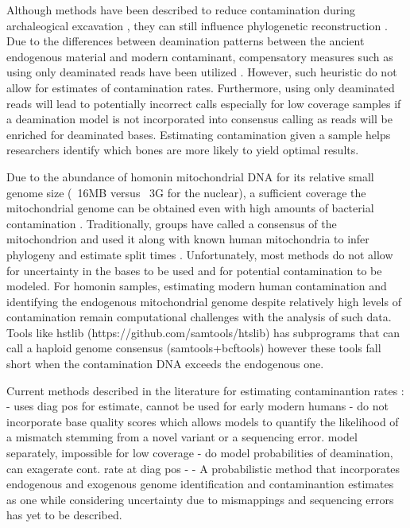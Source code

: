 \documentclass[a4paper,12pt]{article}
\begin{document}
Although methods have been described to reduce contamination during archaleogical excavation \cite{yang2005contamination}, they can still influence phylogenetic reconstruction \cite{wall2007inconsistencies}. Due to the differences between deamination patterns between the ancient endogenous material and modern contaminant, compensatory measures such as using only deaminated reads have been utilized \cite{skoglund2014separating}. However, such heuristic do not allow for estimates of contamination rates. Furthermore, using only deaminated reads will lead to potentially incorrect calls especially for low coverage samples if a deamination model is not incorporated into consensus calling as reads will be enriched for deaminated bases. Estimating contamination given a sample helps researchers identify which bones are more likely to yield optimal results. 

Due to the abundance of homonin mitochondrial DNA for its relative small genome size (~16MB versus ~3G for the nuclear), a sufficient coverage the mitochondrial genome can be obtained even with high amounts of bacterial contamination \cite{green2006analysis}. Traditionally, groups have called a consensus of the mitochondrion and used it along with known human mitochondria to infer phylogeny and estimate split times \cite{cann1987mitochondrial}. Unfortunately, most methods do not allow for uncertainty in the bases to be used and for potential contamination to be modeled. For homonin samples, estimating modern human contamination and identifying the endogenous mitochondrial genome despite relatively high levels of contamination remain computational challenges with the analysis of such data. Tools like hstlib (https://github.com/samtools/htslib) has subprograms that can call a haploid genome consensus (samtools+bcftools) however these tools fall short when the contamination DNA exceeds the endogenous one. 

Current methods \cite{philip} described in the literature for estimating contaminantion rates :
- uses diag pos for estimate, cannot be used for early modern humans
- do not incorporate base quality scores which allows models to quantify the likelihood of a mismatch stemming from a novel variant or a sequencing error. model separately, impossible for low coverage
- do model probabilities of deamination, can exagerate cont. rate at diag pos
- 
- A probabilistic method that incorporates endogenous and exogenous genome identification and contaminantion estimates as one while considering uncertainty due to mismappings and sequencing errors has yet to be described. 
\end{document}
